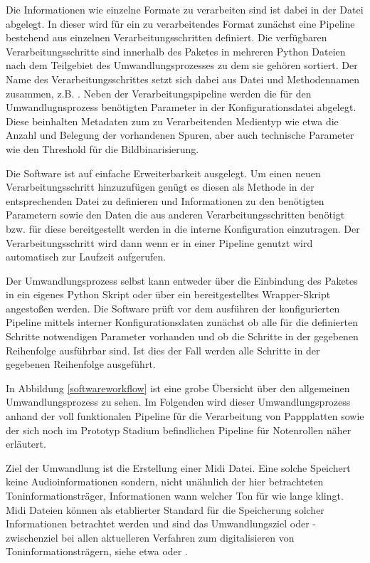 Die Informationen wie einzelne Formate zu verarbeiten sind ist dabei in der  Datei abgelegt.
In dieser wird für ein zu verarbeitendes Format zunächst eine Pipeline bestehend aus einzelnen Verarbeitungsschritten definiert.
Die verfügbaren Verarbeitungsschritte sind innerhalb des Paketes in mehreren Python Dateien nach dem Teilgebiet des Umwandlungsprozesses zu dem sie gehören sortiert.
Der Name des Verarbeitungsschrittes setzt sich dabei aus Datei und Methodennamen zusammen, z.B. .
Neben der Verarbeitungspipeline werden die für den Umwandlugnsprozess benötigten Parameter in der Konfigurationsdatei abgelegt.
Diese beinhalten Metadaten zum zu Verarbeitenden Medientyp wie etwa die Anzahl und Belegung der vorhandenen Spuren, aber auch technische Parameter wie den Threshold für die Bildbinarisierung.

Die Software ist auf einfache Erweiterbarkeit ausgelegt.
Um einen neuen Verarbeitungsschritt hinzuzufügen genügt es diesen als Methode in der entsprechenden Datei zu definieren und Informationen zu den benötigten Parametern sowie den Daten die aus anderen Verarbeitungsschritten benötigt bzw. für diese bereitgestellt werden in die interne Konfiguration einzutragen.
Der Verarbeitungsschritt wird dann wenn er in einer Pipeline genutzt wird automatisch zur Laufzeit aufgerufen.

Der Umwandlungsprozess selbst kann entweder über die Einbindung des Paketes in ein eigenes Python Skript oder über ein bereitgestelltes Wrapper-Skript angestoßen werden.
Die Software prüft vor dem ausführen der konfigurierten Pipeline mittels interner Konfigurationsdaten zunächst ob alle für die definierten Schritte notwendigen Parameter vorhanden und ob die Schritte in der gegebenen Reihenfolge ausführbar sind.
Ist dies der Fall werden alle Schritte in der gegebenen Reihenfolge ausgeführt.

In Abbildung \ref*{softwareworkflow} ist eine grobe Übersicht über den allgemeinen Umwandlungsprozess zu sehen.
Im Folgenden wird dieser Umwandlungsprozess anhand der voll funktionalen Pipeline für die Verarbeitung von Pappplatten sowie der sich noch im Prototyp Stadium befindlichen Pipeline für Notenrollen näher erläutert.

Ziel der Umwandlung ist die Erstellung einer Midi Datei.
Eine solche Speichert keine Audioinformationen sondern, nicht unähnlich der hier betrachteten Toninformationsträger, Informationen wann welcher Ton für wie lange klingt.
Midi Dateien können als etablierter Standard für die Speicherung solcher Informationen betrachtet werden und sind das Umwandlungsziel oder -zwischenziel bei allen aktuelleren Verfahren zum digitalisieren von Toninformationsträgern, siehe etwa \textcite[65]{colmenares_2011} oder \textcite[518]{shi_2019}.

